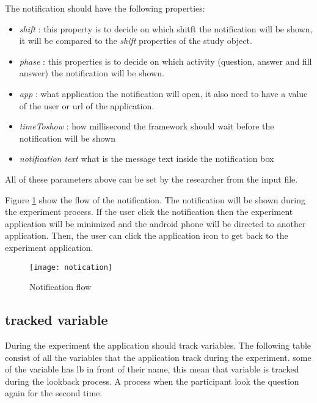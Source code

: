 The notification should have the following properties:
\begin{itemize}
\item \textit{shift} : this property is to decide on which shitft the notification will be shown, it will be compared to the \textit{shift} properties of the study object.
\item \textit{phase} : this properties is to decide on which activity (question, answer and fill answer) the notification will be shown.
\item \textit{app} : what application the notification will open, it also need to have a value of the user or url of the application.
\item \textit{timeToshow} : how millisecond the framework should wait before the notification will be shown
\item \textit{notification text} what is the message text inside the notification box
\end{itemize}
All of these parameters above can be set by the researcher from the input file.

Figure \ref{fig:notification_flow} show the flow of the notification. The notification will be shown during the experiment process. If the user click the notification then the experiment application will be minimized and the android phone will be directed to another application. Then, the user can click the application icon to get back to the experiment application.

\begin{figure}
\begin{center}
\texttt{[image: notication]}
\end{center}
\caption{Notification flow}
\label{fig:notification_flow}
\end{figure}



\subsection{tracked variable}
During the experiment the application should track variables. The following table consist of all the variables that the application track during the experiment. some of the variable has lb in front of their name, this mean that variable is tracked during the lookback process. A process when the participant look the question again for the second time.

